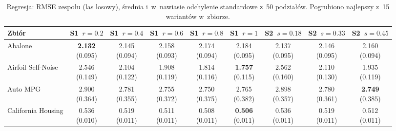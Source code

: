 {\scriptsize\setlength{\tabcolsep}{1.5pt}
\begin{longtable}{lcccccccc}
\caption{Regresja: RMSE zespołu (las losowy), średnia i~w~nawiasie odchylenie standardowe z~50 podziałów. Pogrubiono najlepszy z~15 wariantów w~zbiorze.}\\
\toprule
\textbf{Zbiór} & S1~$r=0.2$ & S1~$r=0.4$ & S1~$r=0.6$ & S1~$r=0.8$ & S1~$r=1$ & S2~$s=0.18$ & S2~$s=0.33$ & S2~$s=0.45$ \\
\midrule
\endhead
Abalone & \makecell{\textbf{2.132}\\{\tiny (0.095)}} & \makecell{2.145\\{\tiny (0.094)}} & \makecell{2.158\\{\tiny (0.093)}} & \makecell{2.174\\{\tiny (0.094)}} & \makecell{2.184\\{\tiny (0.095)}} & \makecell{2.137\\{\tiny (0.095)}} & \makecell{2.146\\{\tiny (0.095)}} & \makecell{2.160\\{\tiny (0.094)}} \\
Airfoil Self-Noise & \makecell{2.546\\{\tiny (0.149)}} & \makecell{2.104\\{\tiny (0.122)}} & \makecell{1.908\\{\tiny (0.119)}} & \makecell{1.814\\{\tiny (0.116)}} & \makecell{\textbf{1.757}\\{\tiny (0.115)}} & \makecell{2.562\\{\tiny (0.160)}} & \makecell{2.110\\{\tiny (0.130)}} & \makecell{1.935\\{\tiny (0.119)}} \\
Auto MPG & \makecell{2.900\\{\tiny (0.364)}} & \makecell{2.781\\{\tiny (0.355)}} & \makecell{2.755\\{\tiny (0.372)}} & \makecell{2.750\\{\tiny (0.375)}} & \makecell{2.765\\{\tiny (0.382)}} & \makecell{2.898\\{\tiny (0.357)}} & \makecell{2.780\\{\tiny (0.361)}} & \makecell{\textbf{2.749}\\{\tiny (0.385)}} \\
California Housing & \makecell{0.536\\{\tiny (0.010)}} & \makecell{0.519\\{\tiny (0.011)}} & \makecell{0.511\\{\tiny (0.011)}} & \makecell{0.508\\{\tiny (0.011)}} & \makecell{\textbf{0.506}\\{\tiny (0.011)}} & \makecell{0.536\\{\tiny (0.011)}} & \makecell{0.519\\{\tiny (0.011)}} & \makecell{0.512\\{\tiny (0.011)}} \\

\end{longtable}}
